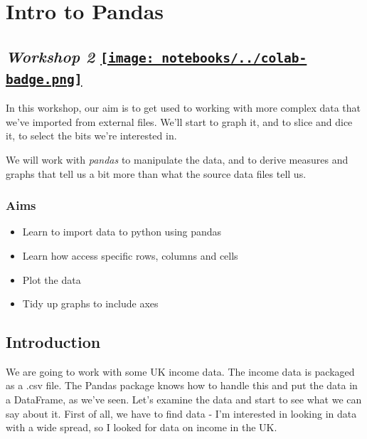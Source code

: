 \documentclass[
  letterpaper,
  DIV=11,
  numbers=noendperiod]{scrreprt}
\providecommand{\tightlist}{%
  \setlength{\itemsep}{0pt}\setlength{\parskip}{0pt}}\usepackage{longtable,booktabs,array}
\begin{document}

\hypertarget{intro-to-pandas}{%
\chapter{Intro to Pandas}\label{intro-to-pandas}}

\hypertarget{workshop-2-open-in-colab}{%
\section[\emph{Workshop 2} ]{\texorpdfstring{\emph{Workshop 2}
\href{https://colab.research.google.com/github/oballinger/QM2/blob/main/notebooks/W02.\%20Pandas.ipynb}{\protect\texttt{[image: notebooks/../colab-badge.png]}}}{Workshop 2 Open In Colab}}\label{workshop-2-open-in-colab}}

In this workshop, our aim is to get used to working with more complex
data that we've imported from external files. We'll start to graph it,
and to slice and dice it, to select the bits we're interested in.

We will work with \emph{pandas} to manipulate the data, and to derive
measures and graphs that tell us a bit more than what the source data
files tell us.

\hypertarget{aims}{%
\subsection{Aims}\label{aims}}

\begin{itemize}
\tightlist
\item
  Learn to import data to python using pandas
\item
  Learn how access specific rows, columns and cells
\item
  Plot the data
\item
  Tidy up graphs to include axes
\end{itemize}

\hypertarget{introduction}{%
\section{Introduction}\label{introduction}}

We are going to work with some UK income data. The income data is
packaged as a .csv file. The Pandas package knows how to handle this and
put the data in a DataFrame, as we've seen. Let's examine the data and
start to see what we can say about it. First of all, we have to find
data - I'm interested in looking in data with a wide spread, so I looked
for data on income in the UK.
\end{document}
